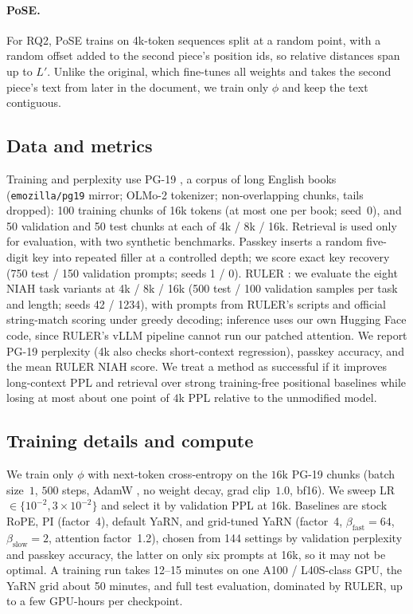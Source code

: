 \documentclass[11pt]{article}
\begin{document}
\paragraph{PoSE.} For RQ2, PoSE \citep{zhu2024pose} trains on 4k-token sequences split at a random point, with a random offset added to the second piece's position ids, so relative distances span up to $L'$. Unlike the original, which fine-tunes all weights and takes the second piece's text from later in the document, we train only $\phi$ and keep the text contiguous.

\subsection{Data and metrics}
\label{sec:data}
\label{sec:metrics}

Training and perplexity use PG-19 \citep{rae2020pg19}, a corpus of long English books
(\texttt{emozilla/pg19} mirror; OLMo-2 tokenizer; non-overlapping chunks, tails dropped): 100 training chunks of 16k tokens
(at most one per book; seed~0), and 50 validation and 50 test chunks at each of 4k / 8k / 16k.
Retrieval is used only for evaluation, with two synthetic benchmarks.
Passkey \citep{mohtashami2023landmark} inserts a random five-digit key into
repeated filler at a controlled depth; we score exact key recovery
(750 test / 150 validation prompts; seeds 1 / 0).
RULER \citep{hsieh2024ruler}: we evaluate the eight NIAH task variants
at 4k / 8k / 16k (500 test / 100 validation samples per task and length; seeds 42 / 1234), with prompts from RULER's scripts and official string-match
scoring under greedy decoding; inference uses our own Hugging Face code, since RULER's
vLLM pipeline cannot run our patched attention.
We report PG-19 perplexity (4k also checks short-context regression), passkey accuracy,
and the mean RULER NIAH score.
We treat a method as successful if it improves long-context PPL and retrieval over
strong training-free positional baselines while losing at most about one point of
$4$k PPL relative to the unmodified model.

\subsection{Training details and compute}
\label{sec:train-details}

We train only $\phi$ with next-token cross-entropy on the $16$k PG-19 chunks
(batch size~$1$, $500$ steps, AdamW \citep{loshchilov2019adamw}, no weight decay, grad clip~$1.0$, bf16).
We sweep LR $\in\{10^{-2},3{\times}10^{-2}\}$ and select it by validation PPL at 16k.
Baselines are stock RoPE, PI (factor~4), default YaRN, and grid-tuned YaRN
(factor~4, $\beta_{\mathrm{fast}}{=}64$, $\beta_{\mathrm{slow}}{=}2$, attention factor~1.2),
chosen from 144 settings by validation perplexity and passkey accuracy, the latter on only
six prompts at 16k, so it may not be optimal.
A training run takes 12--15 minutes on one A100 / L40S-class GPU, the YaRN grid about
50 minutes, and full test evaluation, dominated by RULER, up to a few GPU-hours per checkpoint.
\end{document}
